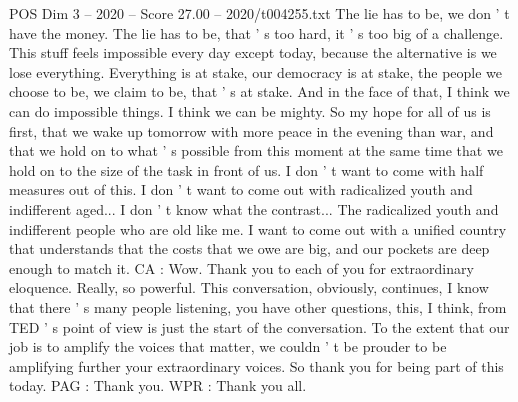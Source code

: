 \begin{textsample}{POS Dim 3 – 2020 – Score 27.00 – 2020/t004255.txt}
The lie has to be, we don ' t have the money.
The lie has to be, that ' s too hard, it ' s too big of a challenge.
This stuff feels impossible every day except today, because the alternative is we lose everything.
Everything is at stake, our democracy is at stake, the people we choose to be, we claim to be, that ' s at stake.
And in the face of that, I think we can do impossible things.
I think we can be mighty.
So my hope for all of us is first, that we wake up tomorrow with more peace in the evening than war, and that we hold on to what ' s possible from this moment at the same time that we hold on to the size of the task in front of us.
I don ' t want to come with half measures out of this.
I don ' t want to come out with radicalized youth and indifferent aged...
I don ' t know what the contrast...
The radicalized youth and indifferent people who are old like me.
I want to come out with a unified country that understands that the costs that we owe are big, and our pockets are deep enough to match it.
CA : Wow.
Thank you to each of you for extraordinary eloquence.
Really, so powerful.
This conversation, obviously, continues, I know that there ' s many people listening, you have other questions, this, I think, from TED ' s point of view is just the start of the conversation.
To the extent that our job is to amplify the voices that matter, we couldn ' t be prouder to be amplifying further your extraordinary voices.
So thank you for being part of this today.
PAG : Thank you.
WPR : Thank you all.

\end{textsample}
